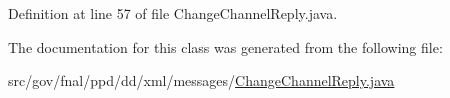 Definition at line 57 of file Change\-Channel\-Reply.\-java.



The documentation for this class was generated from the following file\-:\begin{DoxyCompactItemize}
\item 
src/gov/fnal/ppd/dd/xml/messages/\hyperlink{ChangeChannelReply_8java}{Change\-Channel\-Reply.\-java}\end{DoxyCompactItemize}
